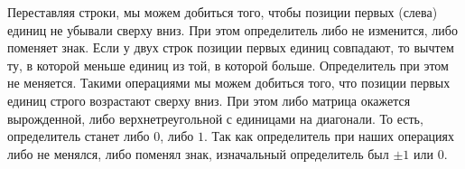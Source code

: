 \documentclass{article}
\begin{document}
Переставляя строки, мы можем добиться того, чтобы позиции первых (слева) единиц не убывали сверху вниз. При этом определитель либо не изменится, либо поменяет знак. Если у двух строк позиции первых единиц совпадают, то вычтем ту, в которой меньше единиц из той, в которой больше. Определитель при этом не меняется. Такими операциями мы можем добиться того, что позиции первых единиц строго возрастают сверху вниз. При этом либо матрица окажется вырожденной, либо верхнетреугольной с единицами на диагонали. То есть, определитель станет либо $0$, либо $1$. Так как определитель при наших операциях либо не менялся, либо поменял знак, изначальный определитель был $\pm 1$ или $0$.
\end{document}
